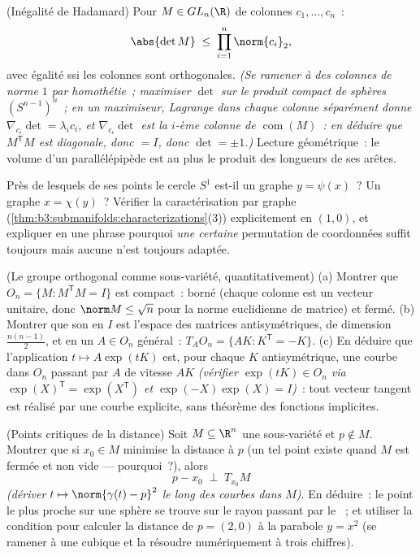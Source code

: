 \begin{exercise}[$\star\star\star$]\label{exo:b3:submanifolds:9}
(Inégalité de Hadamard) Pour $M \in GL_n(\R)$ de colonnes
$c_1, \dots, c_n$~:
\[
\abs{\det M} \;\leq\; \prod_{i=1}^n\norm{c_i}_2 ,
\]
avec égalité ssi les colonnes sont orthogonales. \emph{(Se
ramener à des colonnes de norme $1$ par homothétie~;
maximiser $\det$ sur le produit compact de sphères
$(S^{n-1})^n$~; en un maximiseur, Lagrange dans chaque colonne
séparément donne $\nabla_{c_i}\det = \lambda_ic_i$, et
$\nabla_{c_i}\det$ est la $i$-ème colonne de
$\operatorname{com}(M)$~: en déduire que $M^{\mathsf T}M$
est diagonale, donc $= I$, donc $\det = \pm1$.)} Lecture
géométrique~: le volume d'un parallélépipède est au plus le
produit des longueurs de ses arêtes.
\end{exercise}

\begin{exercise}[$\star\star$]\label{exo:b3:submanifolds:10}
Près de lesquels de ses points le cercle $S^1$ est-il un
graphe $y = \psi(x)$~? Un graphe $x = \chi(y)$~? Vérifier la
caractérisation par graphe
(\cref{thm:b3:submanifolds:characterizations}(3))
explicitement en $(1, 0)$, et expliquer en une phrase
pourquoi \emph{une certaine} permutation de coordonnées
suffit toujours mais aucune n'est toujours adaptée.
\end{exercise}

\begin{exercise}[$\star\star$]\label{exo:b3:submanifolds:11}
(Le groupe orthogonal comme sous-variété, quantitativement)
(a) Montrer que $O_n = \{M : M^{\mathsf T}M = I\}$ est
compact~: borné (chaque colonne est un vecteur unitaire, donc
$\norm M \leq \sqrt n$ pour la norme euclidienne de
matrice) et fermé.
(b) Montrer que son  en $I$ est l'espace des
matrices antisymétriques, de dimension $\frac{n(n-1)}2$, et
en un $A \in O_n$ général~: $T_AO_n = \{AK : K^{\mathsf T} =
-K\}$.
(c) En déduire que l'application $t \mapsto A\exp(tK)$ est,
pour chaque $K$ antisymétrique, une courbe dans $O_n$ passant
par $A$ de vitesse $AK$ \emph{(vérifier $\exp(tK) \in O_n$
via $\exp(X)^{\mathsf T} = \exp(X^{\mathsf T})$ et
$\exp(-X)\exp(X) = I$)}~: tout vecteur tangent est réalisé
par une courbe explicite, sans théorème des fonctions
implicites.
\end{exercise}

\begin{exercise}[$\star\star$]\label{exo:b3:submanifolds:12}
(Points critiques de la distance) Soit $M \subseteq \R^n$ une
sous-variété et $p \notin M$. Montrer que si $x_0 \in M$
minimise la distance à $p$ (un tel point existe quand $M$ est
fermée et non vide --- pourquoi~?), alors
\[
p - x_0 \;\perp\; T_{x_0}M
\]
\emph{(dériver $t \mapsto \norm{\gamma(t) - p}^2$ le long des
courbes dans $M$)}. En déduire~: le point le plus proche sur
une sphère se trouve sur le rayon passant par le ~; et
utiliser la condition pour calculer la distance de $p =
(2, 0)$ à la parabole $y = x^2$ (se ramener à une cubique et
la résoudre numériquement à trois chiffres).
\end{exercise}

